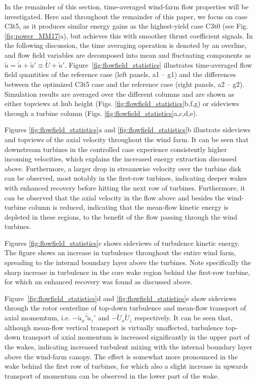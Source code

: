 \documentclass[wes, manuscript]{copernicus}
\begin{document}
In the remainder of this section, time-averaged wind-farm flow properties will be investigated. Here and throughout the remainder of this paper, we focus on case C3t5, as it produces similar energy gains as the highest-yield case C3t0 (see Fig. \ref{fig:power_MM17}a), but achieves this with smoother thrust coefficient signals. In the following discussion, the time averaging operation is denoted by an overline, and flow field variables are decomposed into mean and fluctuating components as $\widetilde{u} = \overline{\widetilde{u}} + \widetilde{u}' \equiv \widetilde{U} + \widetilde{u}'  $. Figure~\ref{fig:flowfield_statistics} illustrates time-averaged flow field quantities of the reference case (left panels, a1 -- g1) and the differences between the optimized C3t5 case and the reference case (right panels, a2 -- g2). Simulation results are averaged over the different columns and are shown as either topviews at hub height (Figs. \ref{fig:flowfield_statistics}b,f,g) or sideviews through a turbine column (Figs. \ref{fig:flowfield_statistics}a,c,d,e). 

Figures \ref{fig:flowfield_statistics}a and \ref{fig:flowfield_statistics}b illustrate sideviews and topviews of the axial velocity throughout the wind farm. It can be seen that downstream turbines in the controlled case experience consistently higher incoming velocities, which explains the increased energy extraction discussed above. Furthermore, a larger drop in streamwise velocity over the turbine disk can be observed, most notably in the first-row turbines, indicating deeper wakes with enhanced recovery before hitting the next row of turbines. Furthermore, it can be observed that the axial velocity in the flow above and besides the wind-turbine column is reduced, indicating that the mean-flow kinetic energy is depleted in these regions, to the benefit of the flow passing through the wind turbines. 

Figures \ref{fig:flowfield_statistics}c shows sideviews of turbulence kinetic energy. The figure shows an increase in turbulence throughout the entire wind farm, spreading to the internal boundary layer above the turbines. Note specifically the sharp increase in turbulence in the core wake region behind the first-row turbine, for which an enhanced recovery was found as discussed above. 

Figure~\ref{fig:flowfield_statistics}d and \ref{fig:flowfield_statistics}e show sideviews through the rotor centerline of top-down turbulence and mean-flow transport of axial momemtum, i.e. $-\overline{\widetilde{u}_x' \widetilde{u}_z'}$ and $- \widetilde{U}_x \widetilde{U}_z$ respectively. It can be seen that, although mean-flow vertical transport is virtually unaffected, turbulence top-down transport of axial momentum is increased significantly in the upper part of the wakes, indicating increased turbulent mixing with the internal boundary layer above the wind-farm canopy. The effect is somewhat more pronounced in the wake behind the first row of turbines, for which also a slight increase in upwards transport of momentum can be observed in the lower part of the wake. 
\end{document}
